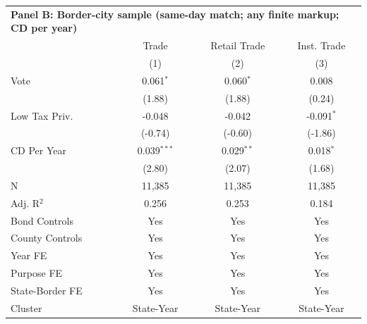 \begingroup
\centering
\begin{tabular*}{\textwidth}{@{\extracolsep{\fill}}lccc}
\multicolumn{5}{l}{\textbf{Panel B: Border-city sample (same-day match; any finite markup; CD per year)}}\\

\addlinespace
   \toprule
                   & Trade         & Retail Trade & Inst. Trade\\  
                   & (1)           & (2)          & (3)\\  
   \midrule 
   Vote            & 0.061$^{*}$   & 0.060$^{*}$  & 0.008\\   
                   & (1.88)       & (1.88)      & (0.24)\\   
   Low Tax Priv.   & -0.048        & -0.042       & -0.091$^{*}$\\   
                   & (-0.74)      & (-0.60)     & (-1.86)\\   
   CD Per Year     & 0.039$^{***}$ & 0.029$^{**}$ & 0.018$^{*}$\\   
                   & (2.80)       & (2.07)      & (1.68)\\   
   \hline
   N    & 11,385        & 11,385       & 11,385\\  
   Adj. R$^2$  & 0.256         & 0.253        & 0.184\\  
   Bond Controls   & Yes           & Yes          & Yes\\  
   County Controls & Yes           & Yes          & Yes\\  
   Year FE         & Yes           & Yes          & Yes\\  
   Purpose FE      & Yes           & Yes          & Yes\\  
   State-Border FE & Yes           & Yes          & Yes\\  
   Cluster              & State-Year & State-Year & State-Year\\  
   \bottomrule
\end{tabular*}
\par\endgroup
